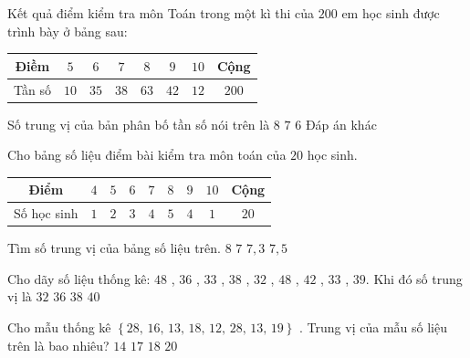 \begin{ex}%
	Kết quả điểm kiểm tra môn Toán trong một kì thi của $ 200$ em học sinh được trình bày ở bảng sau:
	\begin{center}
		\begin{tabular}{|c|c|c|c|c|c|c|c|}
			\hline Điềm & $5$ & $6$ & $7$ & $8$ & $9$ & $10$ & Cộng \\
			\hline Tần số & $10$ & $35$ & $38$ & $63$ & $42$ & $12$ & $200$ \\
			\hline
		\end{tabular}
	\end{center}
	Số trung vị của bản phân bố tần số nói trên là
	\choice
	{\True $8$}
	{$ 7$}
	{$ 6$}
	{Đáp án khác}
\end{ex}
\begin{ex}%
	Cho bảng số liệu điểm bài kiểm tra môn toán của $ 20$ học sinh.\\
	\begin{center}
		\begin{tabular}{|c|c|c|c|c|c|c|c|c|}
			\hline Điểm & $4$ & $5$ & $6$ & $7$ & $8$ & $9$ & $10$ & Cộng \\
			\hline Số học sinh & $1$ & $2$ & $3$ & $4$ & $5$ & $4$ & $1$ & $20$ \\
			\hline
		\end{tabular}
	\end{center}
	Tìm số trung vị của bảng số liệu trên.
	\choice
	{$ 8$}
	{$ 7$}
	{$ 7{,}3$}
	{\True $ 7{,}5$}
\end{ex}
\begin{ex}%
	Cho dãy số liệu thống kê: $48$ , $36$ , $33$ , $38$ , $32$ , $48$ , $42$ , $33$ , $39$. Khi đó số trung vị là
	\choice
	{$32$}
	{$36$}
	{\True $38$}
	{$40$}
\end{ex}
\begin{ex}%
	Cho mẫu thống kê $\left\{28,\,16,\,13,\,18,\,12,\,28,\,13,\,19\right\}$ . Trung vị của mẫu số liệu trên là bao nhiêu?
	\choice
	{$ 14$}
	{\True $ 17$}
	{$ 18$}
	{$ 20$}
\end{ex}
